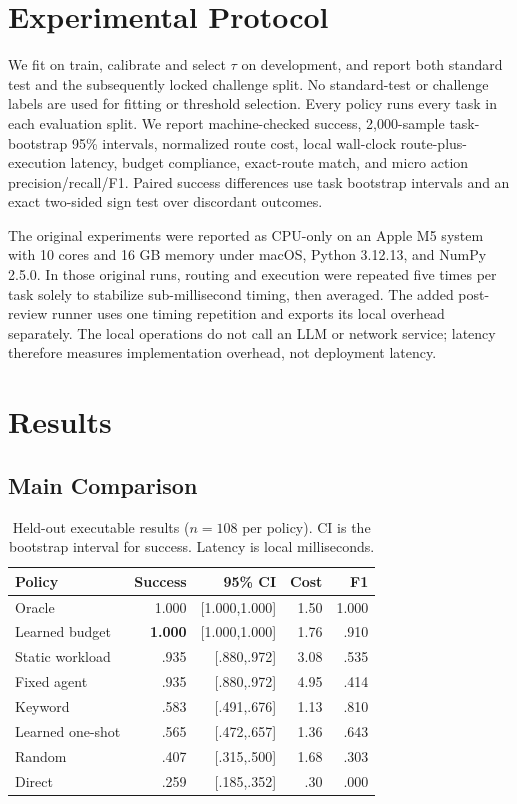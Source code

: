 \documentclass[letterpaper]{article} %
\begin{document}
\section{Experimental Protocol}

We fit on train, calibrate and select $\tau$ on development, and report both standard test and the subsequently locked challenge split. No standard-test or challenge labels are used for fitting or threshold selection. Every policy runs every task in each evaluation split. We report machine-checked success, 2,000-sample task-bootstrap 95\% intervals, normalized route cost, local wall-clock route-plus-execution latency, budget compliance, exact-route match, and micro action precision/recall/F1. Paired success differences use task bootstrap intervals and an exact two-sided sign test over discordant outcomes.

The original experiments were reported as CPU-only on an Apple M5 system with 10 cores and 16 GB memory under macOS, Python 3.12.13, and NumPy 2.5.0. In those original runs, routing and execution were repeated five times per task solely to stabilize sub-millisecond timing, then averaged. The added post-review runner uses one timing repetition and exports its local overhead separately. The local operations do not call an LLM or network service; latency therefore measures implementation overhead, not deployment latency.

\section{Results}

\subsection{Main Comparison}

\begin{table}[t]
\centering
\small
\caption{Held-out executable results ($n=108$ per policy). CI is the bootstrap interval for success. Latency is local milliseconds.}
\label{tab:main}
\begin{tabular}{lrrrr}
\toprule
Policy & Success & 95\% CI & Cost & F1 \\
\midrule
Oracle & 1.000 & [1.000,1.000] & 1.50 & 1.000 \\
Learned budget & \textbf{1.000} & [1.000,1.000] & 1.76 & .910 \\
Static workload & .935 & [.880,.972] & 3.08 & .535 \\
Fixed agent & .935 & [.880,.972] & 4.95 & .414 \\
Keyword & .583 & [.491,.676] & 1.13 & .810 \\
Learned one-shot & .565 & [.472,.657] & 1.36 & .643 \\
Random & .407 & [.315,.500] & 1.68 & .303 \\
Direct & .259 & [.185,.352] & .30 & .000 \\
\bottomrule
\end{tabular}
\end{table}
\end{document}
